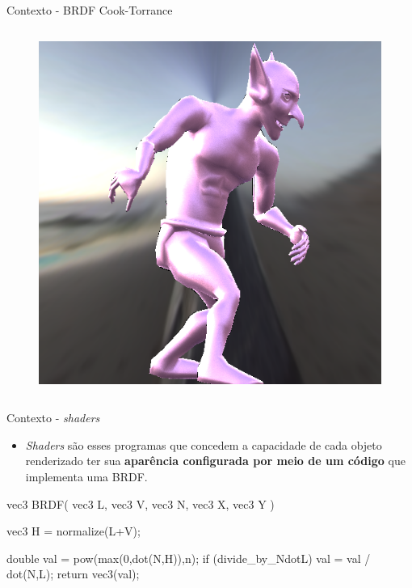 \begin{frame}{Contexto - BRDF Cook-Torrance}
\begin{columns}
\begin{figure}[H]
            
            \includegraphics[height=0.32\textheight]{./Imagens/brdfs/cook-torrance-alternative-goblin.png}
            
        \end{figure}
    \end{columns}
\end{frame}


\begin{frame}[fragile]{Contexto - \textit{shaders}}
\begin{itemize}
\item \textit{Shaders} são esses programas que concedem a capacidade de cada objeto renderizado ter sua \textbf{aparência configurada por meio de um código} que implementa uma BRDF.
\end{itemize}

\begin{clang}
vec3 BRDF( vec3 L, vec3 V, vec3 N, vec3 X, vec3 Y )
{
    vec3 H = normalize(L+V);

    double val = pow(max(0,dot(N,H)),n);
    if (divide_by_NdotL)
        val = val / dot(N,L);
    return vec3(val);
}
\end{clang}

\end{frame}

